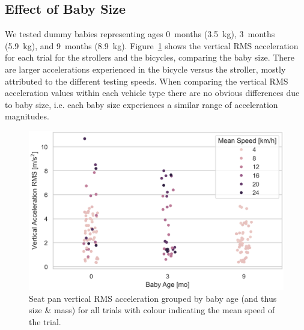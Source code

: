 \documentclass[a4paper]{article}
\begin{document}
\subsection{Effect of Baby Size}
%
We tested dummy babies representing ages 0~months (3.5~\si{\kilo\gram}),
3~months (5.9~\si{\kilo\gram}), and 9~months (8.9~\si{\kilo\gram}).
Figure~\ref{fig:compare-baby-mass} shows the vertical RMS acceleration for each
trial for the strollers and the bicycles, comparing the baby size. There are
larger accelerations experienced in the bicycle versus the stroller, mostly
attributed to the different testing speeds. When comparing the vertical RMS
acceleration values within each vehicle type there are no obvious differences
due to baby size, i.e. each baby size experiences a similar range of
acceleration magnitudes.
%
\begin{figure}
  \centering
  \includegraphics[width=160mm]{fig/SeatBotacc_ver-baby-mass-compare.png}
  \caption{Seat pan vertical RMS acceleration grouped by baby age (and thus size
  \& mass) for all trials with colour indicating the mean speed of the
  trial.}
  \label{fig:compare-baby-mass}
\end{figure}
\end{document}
